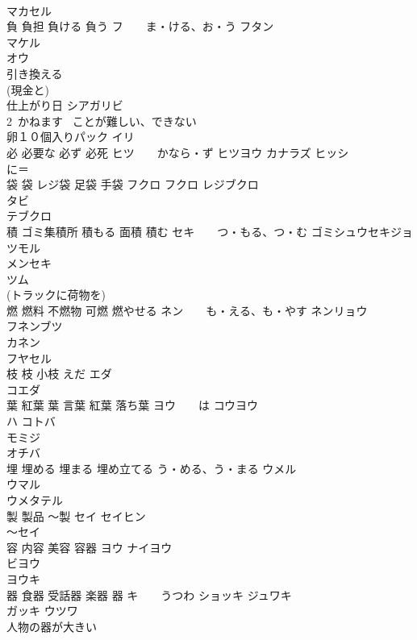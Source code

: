 \documentclass[8pt]{extreport}
\begin{document}
\begin{CJK}{UTF8}{min}
\\	マカセル 
\\	負 負担 負ける 負う	フ　　ま・ける、お・う フタン 
\\	マケル 
\\	オウ 
\\	引き換える	
\\	(現金と)
\\	仕上がり日	シアガリビ 
\\	2~かねます	~ことが難しい、できない
\\	卵１０個入りパック	イリ
\\	必 必要な 必ず 必死	ヒツ　　かなら・ず ヒツヨウ カナラズ ヒッシ 
\\	に＝
\\	袋 袋 レジ袋 足袋 手袋	フクロ フクロ レジブクロ 
\\	タビ 
\\	テブクロ 
\\	積 ゴミ集積所 積もる 面積 積む	セキ　　つ・もる、つ・む ゴミシュウセキジョ　
\\	ツモル 
\\	メンセキ 
\\	ツム 
\\	(トラックに荷物を)
\\	燃 燃料 不燃物 可燃 燃やせる	ネン　　も・える、も・やす ネンリョウ　
\\	フネンブツ 
\\	カネン 
\\	フヤセル 
\\	枝 枝 小枝	えだ エダ　
\\	コエダ　
\\	葉 紅葉 葉 言葉 紅葉 落ち葉	ヨウ　　は コウヨウ
\\	ハ コトバ
\\	モミジ 
\\	オチバ 
\\	埋 埋める 埋まる 埋め立てる	う・める、う・まる ウメル 
\\	ウマル 
\\	ウメタテル 
\\	製 製品 〜製	セイ セイヒン 
\\	〜セイ 
\\	容 内容 美容 容器	ヨウ ナイヨウ 
\\	ビヨウ 
\\	ヨウキ 
\\	器 食器 受話器 楽器 器	キ　　うつわ ショッキ ジュワキ
\\	ガッキ ウツワ　
\\	人物の器が大きい 

\end{CJK}
\end{document}
